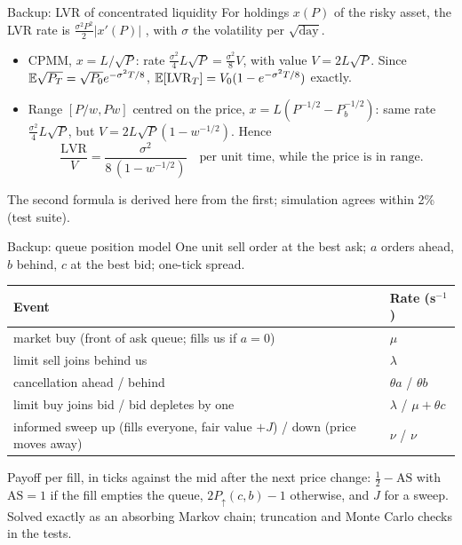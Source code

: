 \begin{frame}{Backup: LVR of concentrated liquidity}
  \small
  For holdings $x(P)$ of the risky asset, the LVR rate is $\frac{\sigma^2P^2}{2}|x'(P)|$ \citep{milionis2022automated}, with $\sigma$ the volatility per $\sqrt{\text{day}}$.
  \begin{itemize}
    \item CPMM, $x = L/\sqrt P$: rate $\frac{\sigma^2}{4}L\sqrt P = \frac{\sigma^2}{8}V$, with value $V = 2L\sqrt P$. Since $\mathbb{E}\sqrt{P_T} = \sqrt{P_0}e^{-\sigma^2T/8}$, $\mathbb{E}[\mathrm{LVR}_T] = V_0(1 - e^{-\sigma^2T/8})$ exactly.
    \item Range $[P/w, Pw]$ centred on the price, $x = L(P^{-1/2} - P_b^{-1/2})$: same rate $\frac{\sigma^2}{4}L\sqrt P$, but $V = 2L\sqrt P(1 - w^{-1/2})$. Hence
    \[ \frac{\mathrm{LVR}}{V} = \frac{\sigma^2}{8\,(1 - w^{-1/2})} \quad \text{per unit time, while the price is in range.} \]
  \end{itemize}
  The second formula is derived here from the first; simulation agrees within 2\% (test suite).
\end{frame}

\begin{frame}{Backup: queue position model}
  \small
  One unit sell order at the best ask; $a$ orders ahead, $b$ behind, $c$ at the best bid; one-tick spread.
  \vspace{0.3em}

  \begin{tabular}{ll}
    \toprule
    Event & Rate (s$^{-1}$) \\
    \midrule
    market buy (front of ask queue; fills us if $a = 0$) & $\mu$ \\
    limit sell joins behind us & $\lambda$ \\
    cancellation ahead / behind & $\theta a$ / $\theta b$ \\
    limit buy joins bid / bid depletes by one & $\lambda$ / $\mu + \theta c$ \\
    informed sweep up (fills everyone, fair value $+J$) / down (price moves away) & $\nu$ / $\nu$ \\
    \bottomrule
  \end{tabular}
  \vspace{0.3em}

  Payoff per fill, in ticks against the mid after the next price change: $\tfrac12 - \mathrm{AS}$ with $\mathrm{AS} = 1$ if the fill empties the queue, $2P_\uparrow(c,b) - 1$ otherwise, and $J$ for a sweep. Solved exactly as an absorbing Markov chain; truncation and Monte Carlo checks in the tests.
\end{frame}
